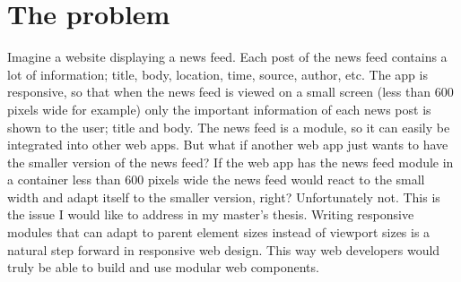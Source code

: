 \documentclass[oneside,a4paper,11pt]{kth-mag}
\begin{document}
\section*{The problem}
Imagine a website displaying a news feed. Each post of the news feed contains a lot of information; title, body, location, time, source, author, etc. The app is responsive, so that when the news feed is viewed on a small screen (less than 600 pixels wide for example) only the important information of each news post is shown to the user; title and body. The news feed is a module, so it can easily be integrated into other web apps. But what if another web app just wants to have the smaller version of the news feed? If the web app has the news feed module in a container less than 600 pixels wide the news feed would react to the small width and adapt itself to the smaller version, right? Unfortunately not. This is the issue I would like to address in my master's thesis. Writing responsive modules that can adapt to parent element sizes instead of viewport sizes is a natural step forward in responsive web design. This way web developers would truly be able to build and use modular web components.
\end{document}
